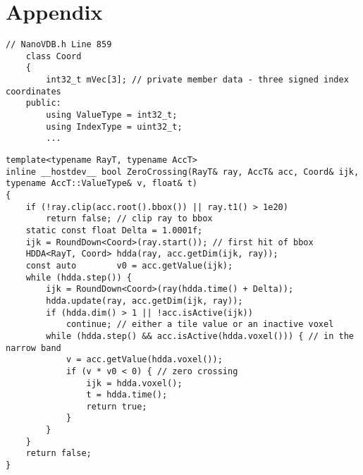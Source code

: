 \section{Appendix}

\begin{lstlisting}[caption={NanoVDBs Coord class. Note that datatypes are hardcoded to integers}]
    // NanoVDB.h Line 859
    class Coord
    {
        int32_t mVec[3]; // private member data - three signed index coordinates
    public:
        using ValueType = int32_t;
        using IndexType = uint32_t;
        ...
\end{lstlisting}
\label{cod:nano_coords}

\begin{lstlisting}[caption={NanoVDBs raytracing implementation. }]  
template<typename RayT, typename AccT>
inline __hostdev__ bool ZeroCrossing(RayT& ray, AccT& acc, Coord& ijk, typename AccT::ValueType& v, float& t)
{
    if (!ray.clip(acc.root().bbox()) || ray.t1() > 1e20)
        return false; // clip ray to bbox
    static const float Delta = 1.0001f;
    ijk = RoundDown<Coord>(ray.start()); // first hit of bbox
    HDDA<RayT, Coord> hdda(ray, acc.getDim(ijk, ray));
    const auto        v0 = acc.getValue(ijk);
    while (hdda.step()) {
        ijk = RoundDown<Coord>(ray(hdda.time() + Delta));
        hdda.update(ray, acc.getDim(ijk, ray));
        if (hdda.dim() > 1 || !acc.isActive(ijk))
            continue; // either a tile value or an inactive voxel
        while (hdda.step() && acc.isActive(hdda.voxel())) { // in the narrow band
            v = acc.getValue(hdda.voxel());
            if (v * v0 < 0) { // zero crossing
                ijk = hdda.voxel();
                t = hdda.time();
                return true;
            }
        }
    }
    return false;
}
\end{lstlisting}
\label{cod:nano_zero_crossing}
